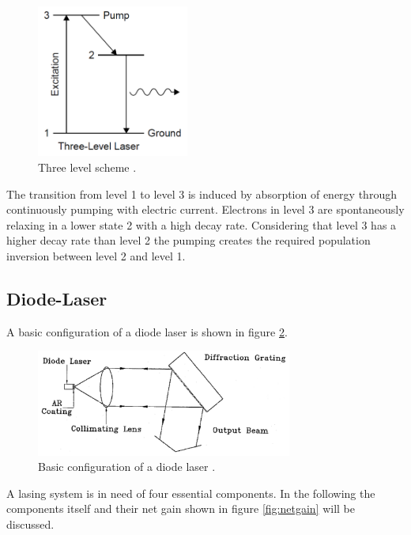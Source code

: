 \newpage
\begin{figure}
  \centering
  \includegraphics[width=5cm]{threelevel.png}
  \caption{Three level scheme \cite{threelevel}.} 
  \label{fig:threelevel}
\end{figure}

\noindent
The transition from level 1 to level 3 is induced by absorption of energy through continuously pumping with electric current.
Electrons in level 3 are spontaneously relaxing in a lower state 2 with a high decay rate.
Considering that level 3 has a higher decay rate than level 2 the pumping creates the required population inversion between level 2 and level 1.


\subsection{Diode-Laser}
\noindent
A basic configuration of a diode laser is shown in figure \ref{fig:diodesetup}.

\begin{figure}
    \centering
    \includegraphics[width=0.75\textwidth]{diodesetup.png}
    \caption{Basic configuration of a diode laser \cite{V60}.} 
    \label{fig:diodesetup}
  \end{figure}

\noindent
A lasing system is in need of four essential components.
In the following the components itself and their net gain shown in figure \ref{fig:netgain} will be discussed.

